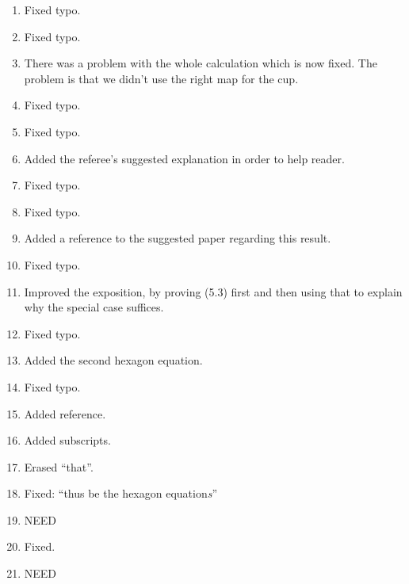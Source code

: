 \documentclass{amsart}
\begin{document}
\begin{enumerate}
\item Fixed typo.

\item Fixed typo.

\item There was a problem with the whole calculation which is now fixed. The problem is that we didn't use the right map for the cup. 

\item Fixed typo.

\item Fixed typo.

\item Added the referee's suggested explanation in order to help reader.

\item Fixed typo.

\item Fixed typo.

\item Added a reference to the suggested paper regarding this result.
\item Fixed typo.

\item Improved the exposition, by proving (5.3) first and then using that to explain why the special case suffices.

\item Fixed typo.

\item Added the second hexagon equation.

\item Fixed typo.

\item Added reference.

\item Added subscripts.

\item Erased ``that''.

\item Fixed: ``thus be the hexagon equation\emph{s}''

\item NEED

\item Fixed.

\item NEED

\end{enumerate}
\end{document}
